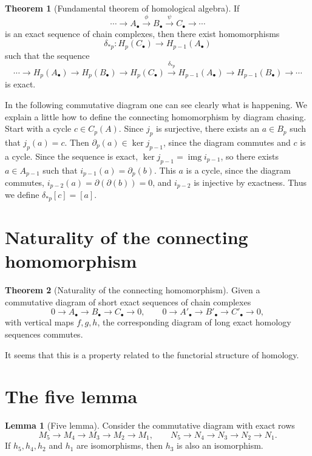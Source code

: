 \documentclass{book}
\theoremstyle{definition}
\newtheorem*{lema}{Lemma}
\newtheorem*{teo}{Theorem}
\DeclareMathOperator{\img}{img}
\begin{document}
\begin{teo}[Fundamental theorem of homological algebra]
If
$$
\cdots\to A_\bullet\xrightarrow\phi B_\bullet
\xrightarrow\psi C_\bullet\to\cdots
$$
is an exact sequence of chain complexes, then there exist
homomorphisms
$$
\delta_{*p}:H_p(C_\bullet)\to H_{p-1}(A_\bullet)
$$
such that the sequence
$$
\cdots\to H_p(A_\bullet)\to H_p(B_\bullet)
\to H_p(C_\bullet)\xrightarrow{\delta_{*p}}
H_{p-1}(A_\bullet)\to H_{p-1}(B_\bullet)\to\cdots
$$
is exact.
\end{teo}

In the following commutative diagram one can see clearly what
is happening. We explain a little how to define the connecting
homomorphism by diagram chasing. Start with a cycle
$c\in C_p(A)$. Since $j_p$ is surjective, there exists an
$a\in B_p$ such that $j_p(a)=c$. Then
$\partial_p(a)\in\ker j_{p-1}$, since the diagram commutes
and $c$ is a cycle. Since the sequence is exact,
$\ker j_{p-1}=\img i_{p-1}$, so there exists
$a\in A_{p-1}$ such that $i_{p-1}(a)=\partial_p(b)$. This
$a$ is a cycle, since the diagram commutes,
$i_{p-2}(a)=\partial(\partial(b))=0$, and $i_{p-2}$ is
injective by exactness. Thus we define $\delta_{*p}[c]=[a]$.

\section{Naturality of the connecting homomorphism}

\begin{teo}[Naturality of the connecting homomorphism]
Given a commutative diagram of short exact sequences of chain
complexes
$$
0\to A_\bullet\to B_\bullet\to C_\bullet\to0,
\qquad
0\to A'_\bullet\to B'_\bullet\to C'_\bullet\to0,
$$
with vertical maps $f,g,h$, the corresponding diagram of long
exact homology sequences commutes.
\end{teo}

It seems that this is a property related to the functorial
structure of homology.

\section{The five lemma}

\begin{lema}[Five lemma]
Consider the commutative diagram with exact rows
$$
M_5\to M_4\to M_3\to M_2\to M_1,
\qquad
N_5\to N_4\to N_3\to N_2\to N_1.
$$
If $h_5,h_4,h_2$ and $h_1$ are isomorphisms, then $h_3$ is
also an isomorphism.
\end{lema}
\end{document}
